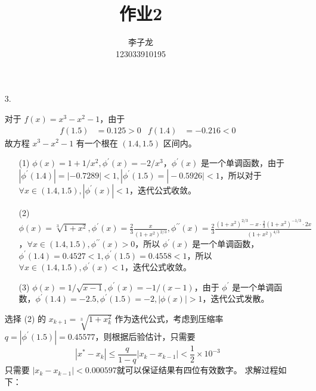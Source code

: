 \documentclass{sjtuarticle}
\title{作业2}
\author{李子龙\\123033910195}
\begin{document}
\maketitle
\begin{itemize}
    \item[3.] \begin{solution}
        对于 $f(x)=x^3-x^2-1$，由于
    \begin{align*}
        f(1.5)&=0.125>0 & f(1.4)&=-0.216<0 
    \end{align*}
    故方程 $x^3-x^2-1$ 有一个根在 $(1.4,1.5)$ 区间内。
    \begin{itemize}
        \item[(1)] $\phi(x)=1+1/x^2,\phi^\prime(x)=-2/x^3$，$\phi^\prime(x)$ 是一个单调函数，由于 $|\phi^\prime(1.4)|=|-0.7289|<1,|\phi^\prime(1.5)=|-0.5926|<1$，所以对于 $\forall x \in (1.4,1.5), |\phi^\prime(x)|<1$，迭代公式收敛。
        \item[(2)] $\phi(x)=\sqrt[3]{1+x^2},\phi^\prime(x)=\frac{2}{3}\frac{x}{(1+x^2)^{2/3}},\phi^{\prime\prime}(x)=\frac{2}{3}\frac{(1+x^2)^{2/3}-x\cdot\frac{2}{3}(1+x^2)^{-1/3}\cdot 2x}{(1+x^2)^{4/3}}$，$\forall x\in(1.4,1.5),\phi^{\prime\prime}(x)>0$，所以 $\phi^\prime(x)$ 是一个单调函数，$\phi^\prime(1.4)=0.4527<1,\phi^\prime(1.5)=0.4558<1$，所以 $\forall x\in (1.4,1.5), \phi^\prime(x)<1$，迭代公式收敛。
        \item[(3)] $\phi(x)=1/\sqrt{x-1},\phi^\prime(x)=-1/(x-1)$，由于 $\phi^\prime$ 是一个单调函数，$\phi^\prime(1.4)=-2.5,\phi^\prime(1.5)=-2,|\phi(x)|>1$，迭代公式发散。
    \end{itemize}
    选择 (2) 的 $x_{k+1}=\sqrt[3]{1+x_k^2}$ 作为迭代公式，考虑到压缩率 $q=|\phi^\prime(1.5)|=0.45577$，则根据后验估计，只需要
    \begin{equation*}
        |x^*-x_k|\leq \frac{q}{1-q} |x_k-x_{k-1}|<\frac{1}{2}\times 10^{-3}
    \end{equation*}
    只需要 $|x_k-x_{k-1}|<0.000597$就可以保证结果有四位有效数字。
    求解过程如下：



\end{solution}
\end{itemize}
\end{document}
